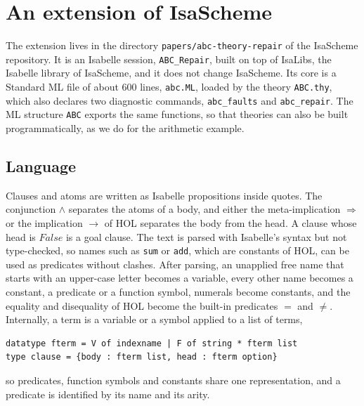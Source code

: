 \documentclass[preprint,12pt]{elsarticle}
\newcommand{\isa}[1]{\texttt{#1}}
\newcommand{\imp}{\Longrightarrow}
\begin{document}
\section{An extension of IsaScheme}
\label{sec:extension}

The extension lives in the directory \isa{papers/abc-theory-repair} of the
IsaScheme repository. It is an Isabelle session, \isa{ABC\_Repair}, built
on top of IsaLibs, the Isabelle library of IsaScheme, and it does not
change IsaScheme. Its core is a Standard ML file of about 600 lines,
\isa{abc.ML}, loaded by the theory \isa{ABC.thy}, which also declares two
diagnostic commands, \isa{abc\_faults} and \isa{abc\_repair}. The ML
structure \isa{ABC} exports the same functions, so that theories can also
be built programmatically, as we do for the arithmetic example.

\subsection{Language}
\label{sec:language}

Clauses and atoms are written as Isabelle propositions inside quotes. The
conjunction $\wedge$ separates the atoms of a body, and either the
meta-implication $\imp$ or the implication $\longrightarrow$ of HOL
separates the body from the head. A clause whose head is $\mathit{False}$
is a goal clause. The text is parsed with Isabelle's syntax but not
type-checked, so names such as \isa{sum} or \isa{add}, which are constants
of HOL, can be used as predicates without clashes. After parsing, an
unapplied free name that starts with an upper-case letter becomes a
variable, every other name becomes a constant, a predicate or a function
symbol, numerals become constants, and the equality and disequality of HOL
become the built-in predicates $=$ and $\neq$. Internally, a term is a
variable or a symbol applied to a list of terms,
\begin{lstlisting}
datatype fterm = V of indexname | F of string * fterm list
type clause = {body : fterm list, head : fterm option}
\end{lstlisting}
so predicates, function symbols and constants share one representation, and
a predicate is identified by its name and its arity.
\end{document}
